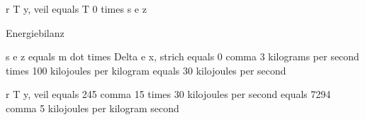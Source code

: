 r T y, veil equals T 0 times s e z

Energiebilanz

s e z equals m dot times Delta e x, strich equals 0 comma 3 kilograms per second times 100 kilojoules per kilogram equals 30 kilojoules per second

r T y, veil equals 245 comma 15 times 30 kilojoules per second equals 7294 comma 5 kilojoules per kilogram second